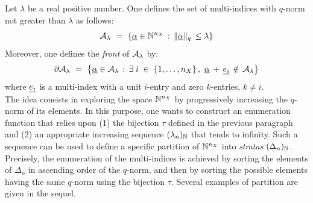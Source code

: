 {Let $\lambda$ be a real positive number. One defines the set of multi-indices with $q$-norm not greater than $\lambda$ as follows:
\begin{equation} \label{eq_q_set}
  {\mathcal A}_{\lambda} \, \, = \, \, \{\underline{\alpha} \in {\mathbb N}^{n_X} \, : \, \|\underline{\alpha}\|_q \, \leq \lambda \}
\end{equation}
Moreover, one defines the \emph{front} of ${\mathcal A}_{\lambda}$ by:
\begin{equation}
  \partial {\mathcal A}_{\lambda} \, \, = \, \, \left\{\underline{\alpha} \in {\mathcal A}_{\lambda} \, : \, \exists \; i \; \in \; \{1,\dots,n_X\} \, , \, \, \underline{\alpha} \, + \, {\underline{e_i}} \, \notin \, {\mathcal A}_{\lambda} \right\}
\end{equation}
where ${\underline{e_i}}$ is a multi-index with a unit $i$-entry and zero $k$-entries, $k\neq i$.  \\

The idea consists in exploring the space ${\mathbb N}^{n_X}$ by progressively increasing the $q$-norm of its elements. In this purpose, one wants to construct an enumeration function that relies upon (1) the bijection $\tau$ defined in the previous paragraph and (2) an appropriate increasing sequence $(\lambda_n)_{{\mathbb N}}$ that tends to infinity. Such a sequence can be used to define a specific partition of ${\mathbb N}^{n_X}$ into \textit{stratas} $(\Delta_n)_{{\mathbb N}}$. Precisely, the enumeration of the multi-indices is achieved by sorting the elements of $\Delta_n$ in ascending order of the $q$-norm, and then by sorting the possible elements having the same $q$-norm using the bijection $\tau$. Several examples of partition are given in the sequel. \\

}
